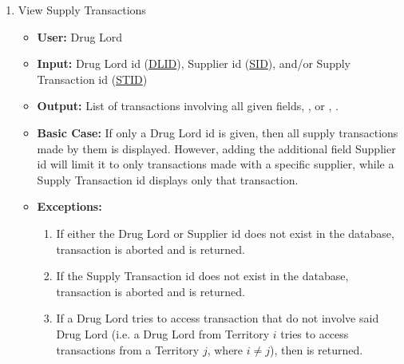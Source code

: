 \documentclass[11pt, oneside]{article}   	%
\theoremstyle{definition}
\theoremstyle{remark}
\begin{document}
\begin{enumerate}
	
	\item View Supply Transactions
	\begin{itemize}
			\item \textbf{User:} Drug Lord
			\item \textbf{Input:} Drug Lord id (\underline{DLID}), Supplier id (\underline{SID}), and/or  Supply Transaction id (\underline{STID})
			\item \textbf{Output:} List of transactions involving all given fields, , or , .
			\item \textbf{Basic Case:} If only a Drug Lord id is given, then all supply transactions made by them is displayed. However, adding the additional field Supplier id will limit it to only transactions made with a specific supplier, while a Supply Transaction id displays only that transaction.
			\item \textbf{Exceptions:}
			\begin{enumerate}
				\item If either the Drug Lord or Supplier id does not exist in the database, transaction is aborted and  is returned.
				\item If the Supply Transaction id does not exist in the database, transaction is aborted and  is returned.
				\item If a Drug Lord tries to access transaction that do not involve said Drug Lord (i.e. a Drug Lord from Territory $i$ tries to access transactions from a Territory $j$, where $i\neq j$), then  is returned.	
			\end{enumerate}
		\end{itemize}
		

\end{enumerate}
\end{document}

